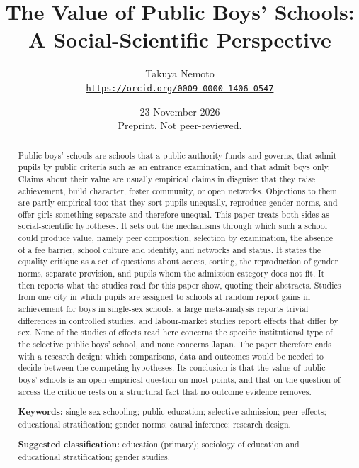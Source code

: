 \documentclass[11pt]{article}
\title{The Value of Public Boys' Schools:\\A Social-Scientific Perspective\\[0.4em]\large\ja{公立男子校の価値：社会科学的観点から}}
\author{Takuya Nemoto\\\small\href{https://orcid.org/0009-0000-1406-0547}{\nolinkurl{https://orcid.org/0009-0000-1406-0547}}}
\date{23 November 2026\\\small Preprint. Not peer-reviewed.}
\newcounter{mech}
\begin{document}
\maketitle

\begin{abstract}
\noindent Public boys' schools are schools that a public authority funds and governs, that admit pupils by public criteria such as an entrance examination, and that admit boys only. Claims about their value are usually empirical claims in disguise: that they raise achievement, build character, foster community, or open networks. Objections to them are partly empirical too: that they sort pupils unequally, reproduce gender norms, and offer girls something separate and therefore unequal. This paper treats both sides as social-scientific hypotheses. It sets out the mechanisms through which such a school could produce value, namely peer composition, selection by examination, the absence of a fee barrier, school culture and identity, and networks and status. It states the equality critique as a set of questions about access, sorting, the reproduction of gender norms, separate provision, and pupils whom the admission category does not fit. It then reports what the studies read for this paper show, quoting their abstracts. Studies from one city in which pupils are assigned to schools at random report gains in achievement for boys in single-sex schools, a large meta-analysis reports trivial differences in controlled studies, and labour-market studies report effects that differ by sex. None of the studies of effects read here concerns the specific institutional type of the selective public boys' school, and none concerns Japan. The paper therefore ends with a research design: which comparisons, data and outcomes would be needed to decide between the competing hypotheses. Its conclusion is that the value of public boys' schools is an open empirical question on most points, and that on the question of access the critique rests on a structural fact that no outcome evidence removes.

\medskip
\noindent\textbf{Keywords:} single-sex schooling; public education; selective admission; peer effects; educational stratification; gender norms; causal inference; research design.

\medskip
\noindent\textbf{Suggested classification:} education (primary); sociology of education and educational stratification; gender studies.
\end{abstract}
\end{document}
